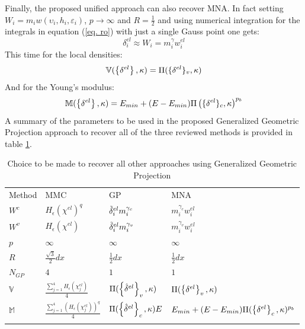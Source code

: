  Finally, the proposed unified approach can also recover MNA. In fact setting $W_i=m_i w(\upsilon_i,h_i,\varepsilon_i)$, $p\to\infty$ and $R=\frac{1}{2}$ and using numerical integration for the integrals in equation (\ref{eq. ro}) with just a single Gauss point one gets:
 \begin{equation}
     \delta_i^{el}\approx W_i=m_i^\gamma w_i^{el}
 \end{equation}
 This time for the local densities:
 \begin{equation}
    \mathbb{V}(\left\{{\delta^{el}}\right\},\kappa)=\Pi(\lbrace\mathbf{{\delta}}^{el}\rbrace_v,\kappa) 
 \end{equation}
 And for the Young's modulus:
  \begin{equation}
    \mathbb{M}(\left\{{\delta^{el}}\right\},\kappa)=E_{min}+(E-E_{min})\Pi\left(\lbrace\mathbf{{\delta}}^{el}\rbrace_c,\kappa\right)^{p_b}
 \end{equation}
  A summary of the parameters to be used in the proposed Generalized Geometric Projection approach to recover all of the three reviewed methods is provided in table \ref{tab:1}.\\
\begin{table}[!h]
\caption{Choice to be made to recover all other approaches using Generalized Geometric Projection }
\label{tab:1}       %
\centering
\begin{tabular}{llll}
\hline\noalign{\smallskip}
Method & MMC & GP & MNA \\
\noalign{\smallskip}\hline\noalign{\smallskip}
$W^c$ & $H_{\epsilon}(\chi^{el})^q$ & $\Tilde{\delta}_i^{el} m_i^{\gamma_c}$&  $m_i^{\gamma_c} w^{el}_i$\\
$W^v$ &$H_{\epsilon}(\chi^{el})$  & $\Tilde{\delta}_i^{el} m_i^{\gamma_v}$&  $m_i^{\gamma_v} w^{el}_i$\\
$p$ &  $\infty$&$\infty$&$\infty$\\
$R$ & $\frac{\sqrt{3}}{2}dx$&  $\frac{1}{2}dx$&  $\frac{1}{2}dx$\\
$N_{GP}$ &  $4$&$1$&$1$\\
$\mathbb{V}$ & $\frac{\sum_{j=1}^4 H_{\epsilon}(\chi_j^{el})}{4}$ & $\Pi(\left\{{\hat{\delta}^{el}}\right\}_v,\kappa)$ & $\Pi(\left\{{{\delta}^{el}}\right\}_v,\kappa)$ \\
$\mathbb{M}$ & $\frac{\sum_{j=1}^4 (H_{\epsilon}(\chi_j^{el}))^q}{4}$ & $\Pi(\left\{{\hat{\delta}^{el}}\right\}_c,\kappa)E$ & $E_{min}+(E-E_{min})\Pi(\left\{{{\delta}^{el}}\right\}_c,\kappa)^{p_b}$ \\
\noalign{\smallskip}\hline
\end{tabular}
\end{table}
